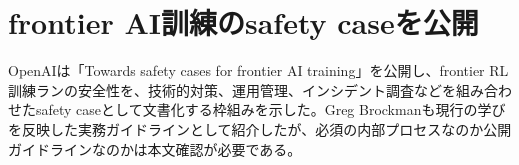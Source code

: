 \section{frontier AI訓練のsafety caseを公開}
OpenAIは「Towards safety cases for frontier AI training」を公開し、frontier RL訓練ランの安全性を、技術的対策、運用管理、インシデント調査などを組み合わせたsafety caseとして文書化する枠組みを示した。Greg Brockmanも現行の学びを反映した実務ガイドラインとして紹介したが、必須の内部プロセスなのか公開ガイドラインなのかは本文確認が必要である。
